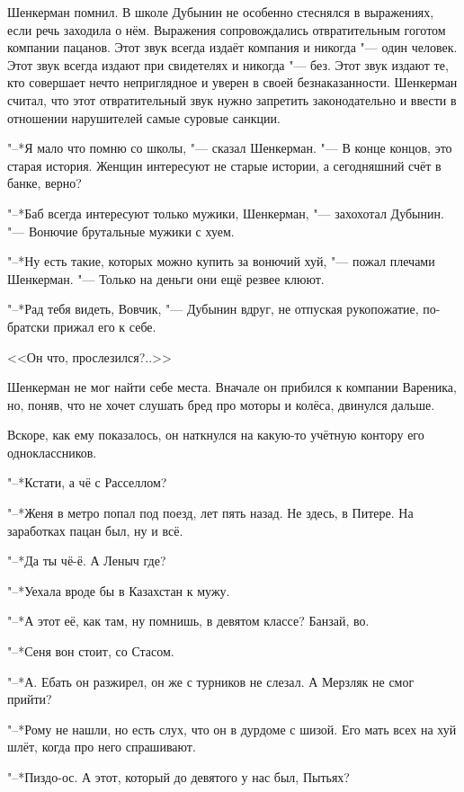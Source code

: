 Шенкерман помнил.
В школе Дубынин не особенно стеснялся в выражениях, если речь заходила о нём.
Выражения сопровождались отвратительным гоготом компании пацанов.
Этот звук всегда издаёт компания и никогда "--- один человек.
Этот звук всегда издают при свидетелях и никогда "--- без.
Этот звук издают те, кто совершает нечто неприглядное и уверен в своей безнаказанности.
Шенкерман считал, что этот отвратительный звук нужно запретить законодательно и ввести в отношении нарушителей самые суровые санкции.

"--*Я мало что помню со школы, "--- сказал Шенкерман.
"--- В конце концов, это старая история.
Женщин интересуют не старые истории, а сегодняшний счёт в банке, верно?

"--*Баб всегда интересуют только мужики, Шенкерман, "--- захохотал Дубынин.
"--- Вонючие брутальные мужики с хуем.

"--*Ну есть такие, которых можно купить за вонючий хуй, "--- пожал плечами Шенкерман.
"--- Только на деньги они ещё резвее клюют.

"--*Рад тебя видеть, Вовчик, "--- Дубынин вдруг, не отпуская рукопожатие, по-братски прижал его к себе.

<<Он что, прослезился?..>>

\asterism

\textspace

Шенкерман не мог найти себе места.
Вначале он прибился к компании Вареника, но, поняв, что не хочет слушать бред про моторы и колёса, двинулся дальше.

Вскоре, как ему показалось, он наткнулся на какую-то учётную контору его одноклассников.

"--*Кстати, а чё с Расселлом?

"--*Женя в метро попал под поезд, лет пять назад.
Не здесь, в Питере.
На заработках пацан был, ну и всё.

"--*Да ты чё-ё.
А Леныч где?

"--*Уехала вроде бы в Казахстан к мужу.

"--*А этот её, как там, ну помнишь, в девятом классе?
Банзай, во.

"--*Сеня вон стоит, со Стасом.

"--*А.
Ебать он разжирел, он же с турников не слезал.
А Мерзляк не смог прийти?

"--*Рому не нашли, но есть слух, что он в дурдоме с шизой.
Его мать всех на хуй шлёт, когда про него спрашивают.

"--*Пиздо-ос.
А этот, который до девятого у нас был, Пытьях?

